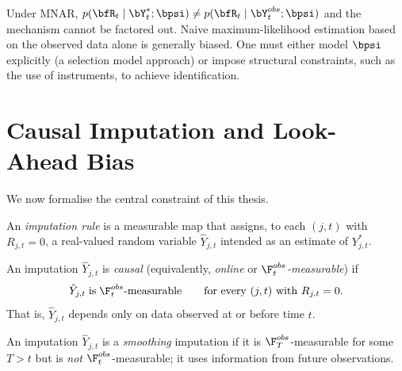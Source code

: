 \begin{remark}
Under MNAR, $p(\bfR_t\mid\bY_t^*;\bpsi)\ne
p(\bfR_t\mid\bY_t^{obs};\bpsi)$ and the mechanism cannot be factored out.
Naive maximum-likelihood estimation based on the observed data alone is
generally biased.  One must either model $\bpsi$ explicitly (a selection
model approach) or impose structural constraints, such as the use of
instruments, to achieve identification.
\end{remark}

\section{Causal Imputation and Look-Ahead Bias}
\label{sec:causal_imputation}

We now formalise the central constraint of this thesis.

\begin{definition}
\label{def:imputation}
An \emph{imputation rule} is a measurable map that assigns, to each
$(j,t)$ with $R_{j,t}=0$, a real-valued random variable
$\hat{Y}_{j,t}$ intended as an estimate of $Y_{j,t}^*$.
\end{definition}

\begin{definition}
\label{def:causal_imputation}
An imputation $\hat{Y}_{j,t}$ is \emph{causal}
(equivalently, \emph{online} or \emph{$\F_t^{obs}$-measurable}) if
\[
  \hat{Y}_{j,t} \;\text{is}\; \F_t^{obs}\text{-measurable}
  \qquad
  \text{for every }(j,t)\text{ with }R_{j,t}=0.
\]
That is, $\hat{Y}_{j,t}$ depends only on data observed at or before time $t$.
\end{definition}

\begin{definition}
\label{def:smoothing_imputation}
An imputation $\hat{Y}_{j,t}$ is a \emph{smoothing} imputation if it is
$\F_T^{obs}$-measurable for some $T>t$ but is \emph{not}
$\F_t^{obs}$-measurable; it uses information from future observations.
\end{definition}

